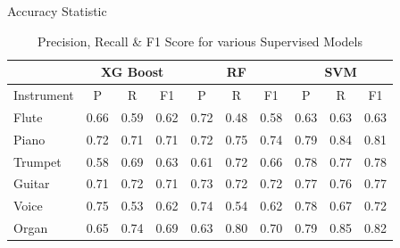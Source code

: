 \documentclass[11pt]{beamer}
\begin{document}
\begin{frame}{Accuracy Statistic}
\begin{minipage}{8cm}
\begin{center}
\begin{table}[h!]
				
				\begin{tabular}{@{}l|lll|lll|lll@{}}
					\toprule
					& \multicolumn{3}{c}{\textbf{XG Boost}}                                  & \multicolumn{3}{c}{\textbf{RF}}                                        & \multicolumn{3}{c}{\textbf{SVM}}                                       \\ \midrule
					Instrument & \multicolumn{1}{c}{P} & \multicolumn{1}{c}{R} & \multicolumn{1}{c}{F1} & \multicolumn{1}{c}{P} & \multicolumn{1}{c}{R} & \multicolumn{1}{c}{F1} & \multicolumn{1}{c}{P} & \multicolumn{1}{c}{R} & \multicolumn{1}{c}{F1} \\
					Flute      & 0.66                  & 0.59                  & 0.62                   & 0.72                  & 0.48                  & 0.58                   & 0.63                  & 0.63                  & 0.63                   \\
					Piano      & 0.72                  & 0.71                  & 0.71                   & 0.72                  & 0.75                  & 0.74                   & 0.79                  & 0.84                  & 0.81                   \\
					Trumpet    & 0.58                  & 0.69                  & 0.63                   & 0.61                  & 0.72                  & 0.66                   & 0.78                  & 0.77                  & 0.78                   \\
					Guitar     & 0.71                  & 0.72                  & 0.71                   & 0.73                  & 0.72                  & 0.72                   & 0.77                  & 0.76                  & 0.77                   \\
					Voice      & 0.75                  & 0.53                  & 0.62                   & 0.74                  & 0.54                  & 0.62                   & 0.78                  & 0.67                  & 0.72                   \\
					Organ      & 0.65                  & 0.74                  & 0.69                   & 0.63                  & 0.80                  & 0.70                   & 0.79                  & 0.85                  & 0.82                   \\ \bottomrule
				\end{tabular}
				\vspace{0.1 in }
					\caption{Precision, Recall \& F1 Score for  various Supervised Models}
			\end{table}
		\end{center}
	\end{minipage}
\end{frame}	
\end{document}

